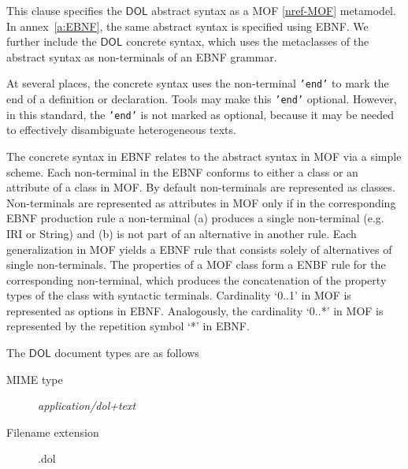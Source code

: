 \documentclass[10pt, a4paper]{isov2}
\newcommand*{\mimetype}[1]{\textit{#1}}
\newcommand*{\syntax}[1]{\texttt{#1}}
\newcommand*{\DOL}{\ensuremath{\mathsf{DOL}}\xspace}
\renewcommand{\noterefname}{note}
\renewcommand{\nref}[1]{\noterefname~\ref{#1}}
\renewcommand{\nref}[1]{\ref{nref-#1}}
\begin{document}
\cleardoublepage
\clause{\DOL  Syntax}\label{c:abstract-syntax}%

This clause specifies the \DOL abstract syntax as a MOF \nref{MOF} metamodel.
In annex~\ref{a:EBNF}, the same abstract syntax is specified using EBNF.
We further include  the \DOL concrete syntax, which
uses the metaclasses of the abstract syntax as non-terminals of
an EBNF grammar.


At several places, the concrete syntax uses the non-terminal
\syntax{'end'} to mark the end of a definition or declaration. Tools
may make this \syntax{'end'} optional. However, in this standard,
the \syntax{'end'} is not marked as optional, because it may be needed to effectively
disambiguate heterogeneous texts.

The concrete syntax in EBNF relates to the abstract syntax in MOF via a simple scheme. Each 
 non-terminal in the EBNF conforms to either a class or an attribute of a class in MOF.
By default non-terminals are represented as classes. Non-terminals are represented as attributes in MOF 
only if in the corresponding EBNF production rule a non-terminal (a) produces 
a single non-terminal  (e.g. IRI or String) and  
(b) is  not part of an alternative in another rule. 
Each generalization in MOF yields a EBNF rule that 
consists solely of alternatives of single non-terminals. 
The properties of a MOF class form a ENBF rule for the corresponding non-terminal, 
which produces the concatenation of the property types of the class with syntactic terminals.
Cardinality  `0..1' in MOF is  represented as options in EBNF.  Analogously, the cardinality 
`0..*' in MOF is represented by the repetition symbol `*' in EBNF.

\medskip
The \DOL document types are as follows
		\begin{description}
			\item[MIME type] \mimetype{application/dol+text}
			\item[Filename extension] .dol
		\end{description}


\label{s:mof-metaclasses}
\end{document}
